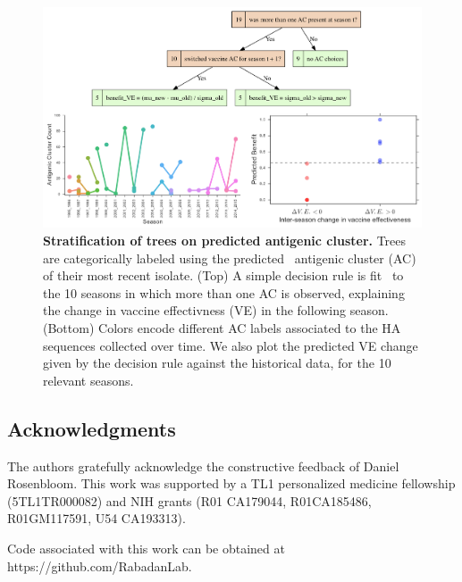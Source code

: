 \documentclass[a4paper,11pt]{article}
\begin{document}
\begin{figure}
    \centering
    \includegraphics[width=\linewidth]{../figures/influenza_antigenic.png}
    \caption{{\bf Stratification of trees on predicted antigenic cluster.} Trees are categorically labeled using the predicted~\cite{du2012mapping} antigenic cluster (AC) of their most recent isolate. (Top) A simple decision rule is fit~\cite{schmidt2009distilling} to the 10 seasons in which more than one AC is observed, explaining the change in vaccine effectivness (VE) in the following season. (Bottom) Colors encode different AC labels associated to the HA sequences collected over time. We also plot the predicted VE change given by the decision rule against the historical data, for the 10 relevant seasons.}
    \label{fig:flu_antigenic}
\end{figure}


\subsection*{Acknowledgments}

The authors gratefully acknowledge the constructive feedback of Daniel Rosenbloom.
This work was supported by a TL1 personalized medicine fellowship (5TL1TR000082) and NIH grants (R01 CA179044, R01CA185486, R01GM117591, U54 CA193313).

\vspace{0.25in}

Code associated with this work can be obtained at https://github.com/RabadanLab.




\end{document}
